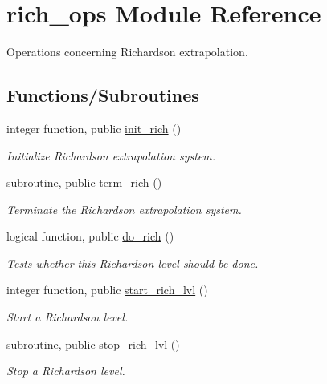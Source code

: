 \hypertarget{namespacerich__ops}{}\section{rich\+\_\+ops Module Reference}
\label{namespacerich__ops}


Operations concerning Richardson extrapolation.  


\subsection*{Functions/\+Subroutines}
\begin{DoxyCompactItemize}
\item 
integer function, public \hyperlink{namespacerich__ops_a9fbbda93eab8973d33063e277c489e7b}{init\+\_\+rich} ()
\begin{DoxyCompactList}\small\item\em Initialize Richardson extrapolation system. \end{DoxyCompactList}\item 
subroutine, public \hyperlink{namespacerich__ops_a3cf72a3ed0806ac9ddff262a00b2e33d}{term\+\_\+rich} ()
\begin{DoxyCompactList}\small\item\em Terminate the Richardson extrapolation system. \end{DoxyCompactList}\item 
logical function, public \hyperlink{namespacerich__ops_a50f4088b9ddd59597987fb4112f2a73e}{do\+\_\+rich} ()
\begin{DoxyCompactList}\small\item\em Tests whether this Richardson level should be done. \end{DoxyCompactList}\item 
integer function, public \hyperlink{namespacerich__ops_a97206a15127960366fcb41d6889cb3b5}{start\+\_\+rich\+\_\+lvl} ()
\begin{DoxyCompactList}\small\item\em Start a Richardson level. \end{DoxyCompactList}\item 
subroutine, public \hyperlink{namespacerich__ops_a0cce16b835e18b025d366a038b22efe1}{stop\+\_\+rich\+\_\+lvl} ()
\begin{DoxyCompactList}\small\item\em Stop a Richardson level. \end{DoxyCompactList}\item 

\end{DoxyCompactItemize}
